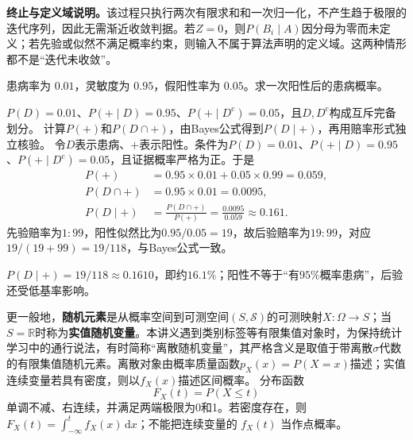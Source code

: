 \textbf{终止与定义域说明。}该过程只执行两次有限求和和一次归一化，不产生趋于极限的迭代序列，因此无需渐近收敛判据。若$Z=0$，则$P(B_i\mid A)$因分母为零而未定义；若先验或似然不满足概率约束，则输入不属于算法声明的定义域。这两种情形都不是“迭代未收敛”。

\label{struct:V1-C04-CH20}
\begin{example}[医学筛查的基率效应]\label{exm:V1-C04-base-rate}
患病率为 $0.01$，灵敏度为 $0.95$，假阳性率为 $0.05$。求一次阳性后的患病概率。
\end{example}
\begin{solution}
\SolGiven $P(D)=0.01$、$P(+\mid D)=0.95$、$P(+\mid D^{\mathrm c})=0.05$，且$D,D^{\mathrm c}$构成互斥完备划分。
\SolPlan 计算$P(+)$和$P(D\cap+)$，由Bayes公式得到$P(D\mid+)$，再用赔率形式独立核验。
\SolDerive
令$D$表示患病、$+$表示阳性。条件为$P(D)=0.01$、$P(+\mid D)=0.95$、$P(+\mid D^{\mathrm c})=0.05$，且证据概率严格为正。于是
\[
\begin{aligned}
P(+)&=0.95\times0.01+0.05\times0.99=0.059,\\
P(D\cap+)&=0.95\times0.01=0.0095,\\
P(D\mid+)&=\frac{P(D\cap+)}{P(+)}
=\frac{0.0095}{0.059}\approx0.161.
\end{aligned}
\]
\SolCheck 先验赔率为$1:99$，阳性似然比为$0.95/0.05=19$，故后验赔率为$19:99$，对应$19/(19+99)=19/118$，与Bayes公式一致。

\SolAnswer $P(D\mid+)=19/118\approx0.1610$，即约$16.1\%$；阳性不等于“有$95\%$概率患病”，后验还受低基率影响。
\end{solution}


更一般地，\textbf{随机元素}是从概率空间到可测空间$(S,\mathcal S)$的可测映射$X:\Omega\to S$；当$S=\mathbb R$时称为\textbf{实值随机变量}。本讲义遇到类别标签等有限集值对象时，为保持统计学习中的通行说法，有时简称“离散随机变量”，其严格含义是取值于带离散$\sigma$代数的有限集值随机元素。离散对象由概率质量函数$p_X(x)=P(X=x)$描述；实值连续变量若具有密度，则以$f_X(x)$描述区间概率。
分布函数
\[
F_X(t)=P(X\le t)
\]
单调不减、右连续，并满足两端极限为0和1。若密度存在，则 $F_X(t)=\int_{-\infty}^{t}f_X(x)\,\mathrm dx$；不能把连续变量的 $f_X(t)$ 当作点概率。

